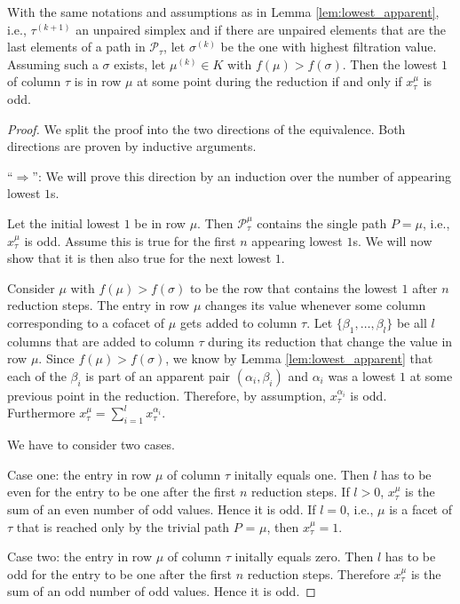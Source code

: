 \begin{lemma}
\label{lem:oddest_ones}
With the same notations and assumptions as in Lemma \ref{lem:lowest_apparent}, i.e., $\tau^{(k+1)}$ an unpaired simplex and if there are unpaired elements that are the last elements of a path in $\mathcal{P}_\tau$, let $\sigma^{(k)}$ be the one with highest filtration value. Assuming such a $\sigma$ exists, let $\mu^{(k)}\in K$ with $f(\mu)>f(\sigma)$. Then the lowest $1$ of column $\tau$ is in row $\mu$ at some point during the reduction if and only if $x_\tau^\mu$ is odd.
\end{lemma}
\begin{proof}
We split the proof into the two directions of the equivalence. Both directions are proven by inductive arguments.

\enquote{$\Rightarrow$}:
We will prove this direction by an induction over the number of appearing lowest $1$s.

Let the initial lowest $1$ be in row $\mu$. Then $\mathcal{P}_\tau^\mu$ contains the single path $P = \mu$, i.e., $x_\tau^\mu$ is odd. Assume this is true for the first $n$ appearing lowest $1$s. We will now show that it is then also true for the next lowest $1$.
 
Consider $\mu$ with $f(\mu) > f(\sigma)$ to be the row that contains the lowest $1$ after $n$ reduction steps. The entry in row $\mu$ changes its value whenever some column corresponding to a cofacet of $\mu$ gets added to column $\tau$. Let $\{\beta_1, \dots ,\beta_l\}$ be all $l$ columns that are added to column $\tau$ during its reduction that change the value in row $\mu$. Since $f(\mu) > f(\sigma)$, we know by Lemma \ref{lem:lowest_apparent} that each of the $\beta_i$ is part of an apparent pair $(\alpha_i, \beta_i)$ and $\alpha_i$ was a lowest $1$ at some previous point in the reduction. Therefore, by assumption, $x_\tau^{\alpha_i}$ is odd. Furthermore $x_\tau^\mu = \sum_{i = 1}^l x_\tau^{\alpha_i}$. 

We have to consider two cases.

Case one: the entry in row $\mu$ of column $\tau$ initally equals one. Then $l$ has to be even for the entry to be one after the first $n$ reduction steps. If $l>0$, $x_\tau^\mu$ is the sum of an even number of odd values. Hence it is odd. If $l=0$, i.e., $\mu$ is a facet of $\tau$ that is reached only by the trivial path $P$ = $\mu$, then $x_\tau^\mu = 1$. 

Case two: the entry in row $\mu$ of column $\tau$ initally equals zero. Then $l$ has to be odd for the entry to be one after the first $n$ reduction steps. Therefore $x_\tau^\mu$ is the sum of an odd number of odd values. Hence it is odd.


\end{proof}
